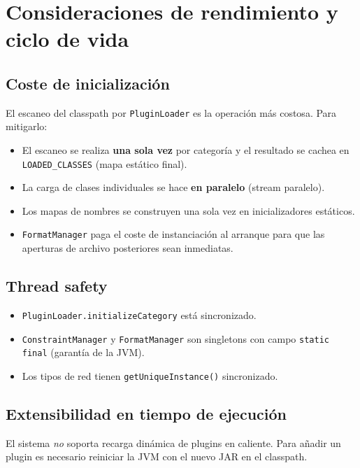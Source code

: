 \documentclass[12pt,a4paper,spanish]{article}
\begin{document}
\section{Consideraciones de rendimiento y ciclo de vida}
\label{sec:rendimiento}

\subsection{Coste de inicialización}

El escaneo del classpath por \texttt{PluginLoader} es la operación más costosa.
Para mitigarlo:
\begin{itemize}
    \item El escaneo se realiza \textbf{una sola vez} por categoría y el resultado
          se cachea en \texttt{LOADED\_CLASSES} (mapa estático final).
    \item La carga de clases individuales se hace \textbf{en paralelo} (stream
          paralelo).
    \item Los mapas de nombres se construyen una sola vez en inicializadores
          estáticos.
    \item \texttt{FormatManager} paga el coste de instanciación al arranque para
          que las aperturas de archivo posteriores sean inmediatas.
\end{itemize}

\subsection{Thread safety}

\begin{itemize}
    \item \texttt{PluginLoader.initializeCategory} está sincronizado.
    \item \texttt{ConstraintManager} y \texttt{FormatManager} son singletons con
          campo \texttt{static final} (garantía de la JVM).
    \item Los tipos de red tienen \texttt{getUniqueInstance()} sincronizado.
\end{itemize}

\subsection{Extensibilidad en tiempo de ejecución}

El sistema \emph{no} soporta recarga dinámica de plugins en caliente. Para añadir
un plugin es necesario reiniciar la JVM con el nuevo JAR en el classpath.
\end{document}
